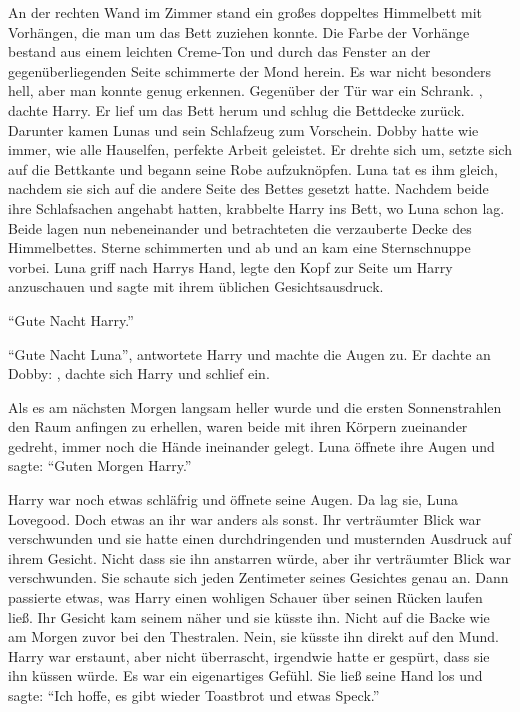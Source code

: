 An der rechten Wand im Zimmer stand ein großes doppeltes Himmelbett mit Vorhängen, die man um das Bett zuziehen konnte. Die Farbe der Vorhänge bestand aus einem leichten Creme-Ton und durch das Fenster an der gegenüberliegenden Seite schimmerte der Mond herein. Es war nicht besonders hell, aber man konnte genug erkennen. Gegenüber der Tür war ein Schrank. , dachte Harry. Er lief um das Bett herum und schlug die Bettdecke zurück. Darunter kamen Lunas und sein Schlafzeug zum Vorschein. Dobby hatte wie immer, wie alle Hauselfen, perfekte Arbeit geleistet. Er drehte sich um, setzte sich auf die Bettkante und begann seine Robe aufzuknöpfen. Luna tat es ihm gleich, nachdem sie sich auf die andere Seite des Bettes gesetzt hatte. Nachdem beide ihre Schlafsachen angehabt hatten, krabbelte Harry ins Bett, wo Luna schon lag. Beide lagen nun nebeneinander und betrachteten die verzauberte Decke des Himmelbettes. Sterne schimmerten und ab und an kam eine Sternschnuppe vorbei. Luna griff nach Harrys Hand, legte den Kopf zur Seite um Harry anzuschauen und sagte mit ihrem üblichen Gesichtsausdruck.

\enquote{Gute Nacht Harry.}

\enquote{Gute Nacht Luna}, antwortete Harry und machte die Augen zu. Er dachte an Dobby: , dachte sich Harry und schlief ein.

Als es am nächsten Morgen langsam heller wurde und die ersten Sonnenstrahlen den Raum anfingen zu erhellen, waren beide mit ihren Körpern zueinander gedreht, immer noch die Hände ineinander gelegt. Luna öffnete ihre Augen und sagte: \enquote{Guten Morgen Harry.}

Harry war noch etwas schläfrig und öffnete seine Augen. Da lag sie, Luna Lovegood. Doch etwas an ihr war anders als sonst. Ihr verträumter Blick war verschwunden und sie hatte einen durchdringenden und musternden Ausdruck auf ihrem Gesicht. Nicht dass sie ihn anstarren würde, aber ihr verträumter Blick war verschwunden. Sie schaute sich jeden Zentimeter seines Gesichtes genau an. Dann passierte etwas, was Harry einen wohligen Schauer über seinen Rücken laufen ließ. Ihr Gesicht kam seinem näher und sie küsste ihn. Nicht auf die Backe wie am Morgen zuvor bei den Thestralen. Nein, sie küsste ihn direkt auf den Mund. Harry war erstaunt, aber nicht überrascht, irgendwie hatte er gespürt, dass sie ihn küssen würde. Es war ein eigenartiges Gefühl. Sie ließ seine Hand los und sagte: \enquote{Ich hoffe, es gibt wieder Toastbrot und etwas Speck.}

